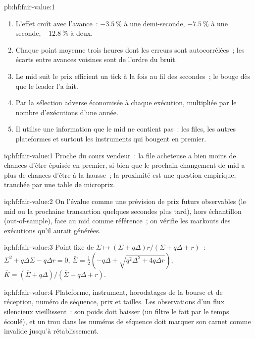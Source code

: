 \begin{solution}{pb:hf:fair-value:1}
\begin{enumerate}
sans lui est à 0.542).
\item L'effet croît avec l'avance~: $-3.5~\%$ à une demi-seconde, $-7.5~\%$ à une seconde, $-12.8~\%$ à deux.
\item Chaque point moyenne trois heures dont les erreurs sont autocorrélées~; les écarts entre avances voisines sont de l'ordre du bruit.
\item Le mid suit le prix efficient un tick à la fois au fil des secondes~; le  bouge dès que le leader l'a fait.
\item Par la sélection adverse économisée à chaque exécution, multipliée par le nombre d'exécutions d'une année.
\item Il utilise une information que le mid ne contient pas~: les files, les autres plateformes et surtout les instruments qui bougent en premier.
\end{enumerate}
\end{solution}

\begin{solution}{iq:hf:fair-value:1}
Proche du cours vendeur~: la file acheteuse a bien moins de chances d'être épuisée en premier, si bien que le prochain changement de mid a plus de chances d'être à la hausse~; la proximité est une question empirique,
tranchée par une table de microprix.
\end{solution}

\begin{solution}{iq:hf:fair-value:2}
On l'évalue comme une prévision de prix futurs observables (le mid ou la prochaine transaction quelques secondes plus tard), hors échantillon (out-of-sample), face au mid comme référence~;
on vérifie les markouts des exécutions qu'il aurait générées.
\end{solution}

\begin{solution}{iq:hf:fair-value:3}
Point fixe de $\Sigma\mapsto(\Sigma+q\Delta)r/(\Sigma+q\Delta+r)$~: $\Sigma^2+q\Delta\Sigma-q\Delta r=0$,
$\bar\Sigma=\tfrac12(-q\Delta+\sqrt{q^2\Delta^2+4q\Delta r})$, $\bar K=(\bar\Sigma+q\Delta)/(\bar\Sigma+q\Delta+r)$.
\end{solution}

\begin{solution}{iq:hf:fair-value:4}
Plateforme, instrument, horodatages de la bourse et de réception, numéro de séquence, prix et tailles. Les observations d'un flux silencieux vieillissent~: son poids doit baisser
(un filtre le fait par le temps écoulé), et un trou dans les numéros de séquence doit marquer son carnet comme invalide jusqu'à rétablissement.
\end{solution}

